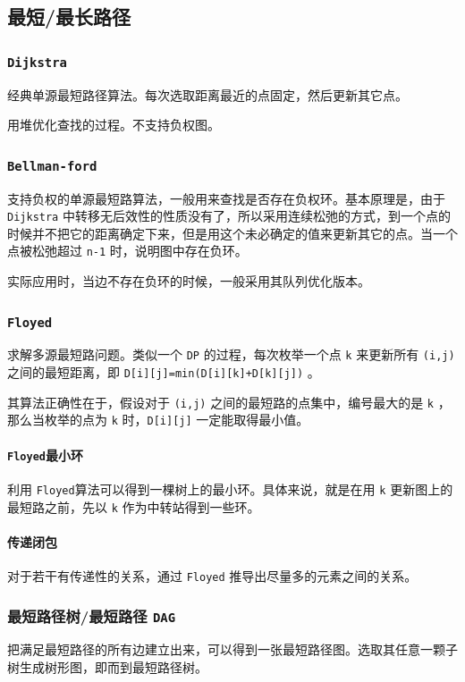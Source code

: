 \documentclass[UTF-8]{ctexart}
\begin{document}
	\subsection{最短/最长路径}
	\subsubsection{\texttt{Dijkstra}}
	经典单源最短路径算法。每次选取距离最近的点固定，然后更新其它点。
	
	用堆优化查找的过程。不支持负权图。
	\subsubsection{\texttt{Bellman-ford}}
	支持负权的单源最短路算法，一般用来查找是否存在负权环。基本原理是，由于 \texttt{Dijkstra} 中转移无后效性的性质没有了，所以采用连续松弛的方式，到一个点的时候并不把它的距离确定下来，但是用这个未必确定的值来更新其它的点。当一个点被松弛超过 \texttt{n-1} 时，说明图中存在负环。
	
	实际应用时，当边不存在负环的时候，一般采用其队列优化版本。
	\subsubsection{\texttt{Floyed}}
	求解多源最短路问题。类似一个 \texttt{DP} 的过程，每次枚举一个点 \texttt{k} 来更新所有 \texttt{(i,j)} 之间的最短距离，即 \texttt{D[i][j]=min(D[i][k]+D[k][j])} 。
	
	其算法正确性在于，假设对于 \texttt{(i,j)} 之间的最短路的点集中，编号最大的是 \texttt{k} ，那么当枚举的点为 \texttt{k} 时，\texttt{D[i][j]} 一定能取得最小值。
	
	\paragraph{\texttt{Floyed}最小环} 利用 \texttt{Floyed}算法可以得到一棵树上的最小环。具体来说，就是在用 \texttt{k} 更新图上的最短路之前，先以 \texttt{k} 作为中转站得到一些环。
	\paragraph{传递闭包} 对于若干有传递性的关系，通过 \texttt{Floyed} 推导出尽量多的元素之间的关系。
	\subsubsection{最短路径树/最短路径 \texttt{DAG}}
	把满足最短路径的所有边建立出来，可以得到一张最短路径图。选取其任意一颗子树生成树形图，即而到最短路径树。
	
\end{document}
